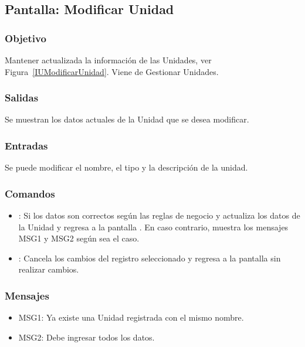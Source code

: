\subsection{Pantalla: Modificar Unidad}

\subsubsection{Objetivo}
	Mantener actualizada la información de las Unidades, ver Figura~\ref{IUModificarUnidad}. Viene de Gestionar Unidades.


\subsubsection{Salidas}
	Se muestran los datos actuales de la Unidad que se desea modificar.

\subsubsection{Entradas}
	Se puede modificar el nombre, el tipo y la descripción de la unidad.

\subsubsection{Comandos}
\begin{itemize}
 	\item {}: Si los datos son correctos según las reglas de negocio  y  actualiza los datos de la Unidad y regresa a la pantalla . En caso contrario, muestra los mensajes MSG1 y MSG2 según sea el caso.
 	\item {}: Cancela los cambios del registro seleccionado y regresa a la pantalla  sin realizar cambios.
\end{itemize}

\subsubsection{Mensajes}
\begin{itemize}
 	\item MSG1: Ya existe una Unidad registrada con el mismo nombre.
 	\item MSG2: Debe ingresar todos los datos.
\end{itemize}